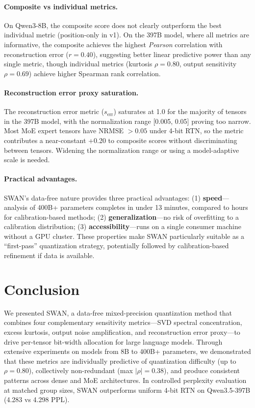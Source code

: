 \documentclass{article}
\begin{document}
\paragraph{Composite vs individual metrics.}
On Qwen3-8B, the composite score does not clearly outperform the best individual metric (position-only in v1). On the 397B model, where all metrics are informative, the composite achieves the highest \emph{Pearson} correlation with reconstruction error ($r = 0.40$), suggesting better linear predictive power than any single metric, though individual metrics (kurtosis $\rho = 0.80$, output sensitivity $\rho = 0.69$) achieve higher Spearman rank correlation.

\paragraph{Reconstruction error proxy saturation.}
The reconstruction error metric ($s_\text{err}$) saturates at 1.0 for the majority of tensors in the 397B model, with the normalization range [0.005, 0.05] proving too narrow. Most MoE expert tensors have NRMSE $> 0.05$ under 4-bit RTN, so the metric contributes a near-constant +0.20 to composite scores without discriminating between tensors. Widening the normalization range or using a model-adaptive scale is needed.

\paragraph{Practical advantages.}
SWAN's data-free nature provides three practical advantages: (1) \textbf{speed}---analysis of 400B+ parameters completes in under 13 minutes, compared to hours for calibration-based methods; (2) \textbf{generalization}---no risk of overfitting to a calibration distribution; (3) \textbf{accessibility}---runs on a single consumer machine without a GPU cluster. These properties make SWAN particularly suitable as a ``first-pass'' quantization strategy, potentially followed by calibration-based refinement if data is available.

\section{Conclusion}
\label{sec:conclusion}

We presented SWAN, a data-free mixed-precision quantization method that combines four complementary sensitivity metrics---SVD spectral concentration, excess kurtosis, output noise amplification, and reconstruction error proxy---to drive per-tensor bit-width allocation for large language models. Through extensive experiments on models from 8B to 400B+ parameters, we demonstrated that these metrics are individually predictive of quantization difficulty (up to $\rho = 0.80$), collectively non-redundant (max $|\rho| = 0.38$), and produce consistent patterns across dense and MoE architectures. In controlled perplexity evaluation at matched group sizes, SWAN outperforms uniform 4-bit RTN on Qwen3.5-397B (4.283 vs 4.298 PPL).
\end{document}
